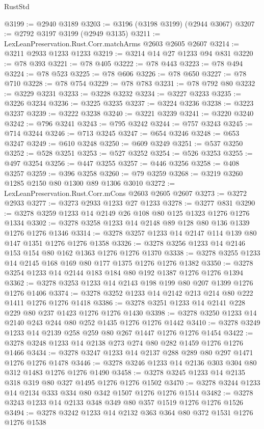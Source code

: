\begin{lexlean}{RustStd}
\begin{coremodule}
@3199 := @2940 @3189
@3203 := @3196 (@3198 @3199) (@2944 @3067)
@3207 := @2792 @3197 @3199 (@2949 @3135)
@3211 := LexLeanPreservation.Rust.Corr.matchArms @2603 @2605 @2607
@3214 := @3211 @2933 @1233 @1233
@3219 := @3214 @14 @27 @1233 @94 @831
@3220 := @78 @393
@3221 := @78 @405
@3222 := @78 @443
@3223 := @78 @494
@3224 := @78 @523
@3225 := @78 @606
@3226 := @78 @650
@3227 := @78 @710
@3228 := @78 @754
@3229 := @78 @783
@3231 := @78 @792 @80
@3232 := @3229 @3231
@3233 := @3228 @3232
@3234 := @3227 @3233
@3235 := @3226 @3234
@3236 := @3225 @3235
@3237 := @3224 @3236
@3238 := @3223 @3237
@3239 := @3222 @3238
@3240 := @3221 @3239
@3241 := @3220 @3240
@3242 := @796 @3241
@3243 := @795 @3242
@3244 := @757 @3243
@3245 := @714 @3244
@3246 := @713 @3245
@3247 := @654 @3246
@3248 := @653 @3247
@3249 := @610 @3248
@3250 := @609 @3249
@3251 := @537 @3250
@3252 := @528 @3251
@3253 := @527 @3252
@3254 := @526 @3253
@3255 := @497 @3254
@3256 := @447 @3255
@3257 := @446 @3256
@3258 := @408 @3257
@3259 := @396 @3258
@3260 := @79 @3259
@3268 := @3219 @3260 @1285 @2150 @80 @1300 @89 @1306 @3010
@3272 := LexLeanPreservation.Rust.Corr.mCons @2603 @2605 @2607
@3273 := @3272 @2933
@3277 := @3273 @2933 @1233 @27 @1233
@3278 := @3277 @831
@3290 := @3278 @3259 @1233 @14 @2149 @26 @108 @80 @125 @1323 @1276 @1276 @1334
@3302 := @3278 @3258 @1233 @14 @2148 @89 @128 @80 @136 @1339 @1276 @1276 @1346
@3314 := @3278 @3257 @1233 @14 @2147 @114 @139 @80 @147 @1351 @1276 @1276 @1358
@3326 := @3278 @3256 @1233 @14 @2146 @153 @154 @80 @162 @1363 @1276 @1276 @1370
@3338 := @3278 @3255 @1233 @14 @2145 @168 @169 @80 @177 @1375 @1276 @1276 @1382
@3350 := @3278 @3254 @1233 @14 @2144 @183 @184 @80 @192 @1387 @1276 @1276 @1394
@3362 := @3278 @3253 @1233 @14 @2143 @198 @199 @80 @207 @1399 @1276 @1276 @1406
@3374 := @3278 @3252 @1233 @14 @2142 @213 @214 @80 @222 @1411 @1276 @1276 @1418
@3386 := @3278 @3251 @1233 @14 @2141 @228 @229 @80 @237 @1423 @1276 @1276 @1430
@3398 := @3278 @3250 @1233 @14 @2140 @243 @244 @80 @252 @1435 @1276 @1276 @1442
@3410 := @3278 @3249 @1233 @14 @2139 @258 @259 @80 @267 @1447 @1276 @1276 @1454
@3422 := @3278 @3248 @1233 @14 @2138 @273 @274 @80 @282 @1459 @1276 @1276 @1466
@3434 := @3278 @3247 @1233 @14 @2137 @288 @289 @80 @297 @1471 @1276 @1276 @1478
@3446 := @3278 @3246 @1233 @14 @2136 @303 @304 @80 @312 @1483 @1276 @1276 @1490
@3458 := @3278 @3245 @1233 @14 @2135 @318 @319 @80 @327 @1495 @1276 @1276 @1502
@3470 := @3278 @3244 @1233 @14 @2134 @333 @334 @80 @342 @1507 @1276 @1276 @1514
@3482 := @3278 @3243 @1233 @14 @2133 @348 @349 @80 @357 @1519 @1276 @1276 @1526
@3494 := @3278 @3242 @1233 @14 @2132 @363 @364 @80 @372 @1531 @1276 @1276 @1538

\end{coremodule}
\end{lexlean}
